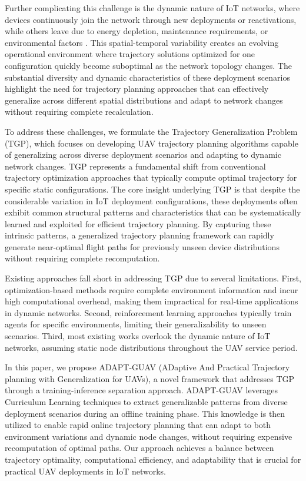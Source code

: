 \documentclass[10pt,conference,letterpaper]{IEEEtran}
\begin{document}
Further complicating this challenge is the dynamic nature of IoT networks, where devices continuously join the network through new deployments or reactivations, while others leave due to energy depletion, maintenance requirements, or environmental factors \cite{DBLP:journals/tmc/ChenQSW25}. This spatial-temporal variability creates an evolving operational environment where trajectory solutions optimized for one configuration quickly become suboptimal as the network topology changes. The substantial diversity and dynamic characteristics of these deployment scenarios highlight the need for trajectory planning approaches that can effectively generalize across different spatial distributions and adapt to network changes without requiring complete recalculation.



To address these challenges, we formulate the Trajectory Generalization Problem (TGP), which focuses on developing UAV trajectory planning algorithms capable of generalizing across diverse deployment scenarios and adapting to dynamic network changes. TGP represents a fundamental shift from conventional trajectory optimization approaches that typically compute optimal trajectory for specific static configurations. The core insight underlying TGP is that despite the considerable variation in IoT deployment configurations, these deployments often exhibit common structural patterns and characteristics that can be systematically learned and exploited for efficient trajectory planning. By capturing these intrinsic patterns, a generalized trajectory planning framework can rapidly generate near-optimal flight paths for previously unseen device distributions without requiring complete recomputation.


Existing approaches fall short in addressing TGP due to several limitations. First, optimization-based methods require complete environment information and incur high computational overhead, making them impractical for real-time applications in dynamic networks. Second, reinforcement learning approaches typically train agents for specific environments, limiting their generalizability to unseen scenarios. Third, most existing works overlook the dynamic nature of IoT networks, assuming static node distributions throughout the UAV service period.

In this paper, we propose ADAPT-GUAV (ADaptive And Practical Trajectory planning with Generalization for UAVs), a novel framework that addresses TGP through a training-inference separation approach. ADAPT-GUAV leverages Curriculum Learning techniques to extract generalizable patterns from diverse deployment scenarios during an offline training phase. This knowledge is then utilized to enable rapid online trajectory planning that can adapt to both environment variations and dynamic node changes, without requiring expensive recomputation of optimal paths. Our approach achieves a balance between trajectory optimality, computational efficiency, and adaptability that is crucial for practical UAV deployments in IoT networks.
\end{document}
